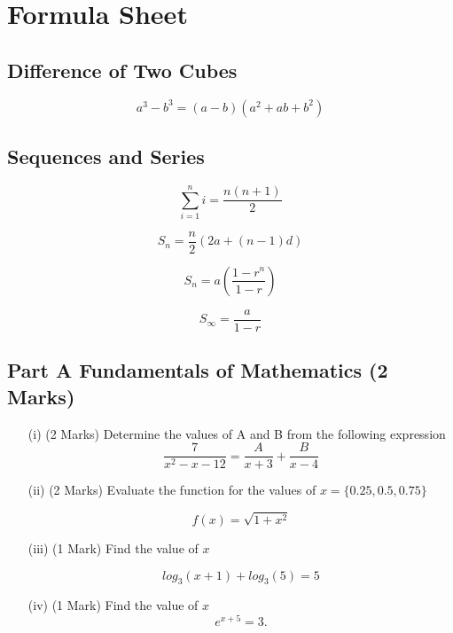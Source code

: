\documentclass[11pt]{article} %
\begin{document}

\newpage


\LARGE
\section*{Formula Sheet}

\subsection*{Difference of Two Cubes}
\[ a^3 - b^3 = (a-b)(a^2 + ab + b^2)\]
\subsection*{Sequences and Series}
\[ \sum_{i=1}^{n} i = \frac{n(n+1)}{2}\]

\[ S_n = \frac{n}{2} \left(2a + (n-1) d \right)\]

\[ S_n = a\left(\frac{1-r^n}{1-r}\right)\]

\[ S_\infty = \frac{a}{1-r}\]
\newpage


\subsection*{Part A Fundamentals of Mathematics (2 Marks) } %

\begin{itemize}
	
	\item[(i)] (2 Marks) Determine the values of A and B from the following expression
	\[  \frac{7}{x^2-x-12} = \frac{A}{x+3} + \frac{B}{x-4}\]
	\vspace{1.5cm}
	
	\item[(ii)] (2 Marks) Evaluate the function for the values of  $ x = \{0.25, 0.5 , 0.75 \}$
	
	\[  f(x) = \sqrt{1+x^2} \]
	

	\vspace{1.8cm}
	\newpage
	
	\item [(iii)](1 Mark) Find the value of $x$
	
	\[log_3(x + 1) + log_3(5) = 5\]
	
		
		\vspace{1.8cm}
		
	\item[(iv)] (1 Mark) Find the value of $x$
		\[e^{x+5} = 3. \]
	
\end{itemize}
\end{document}
